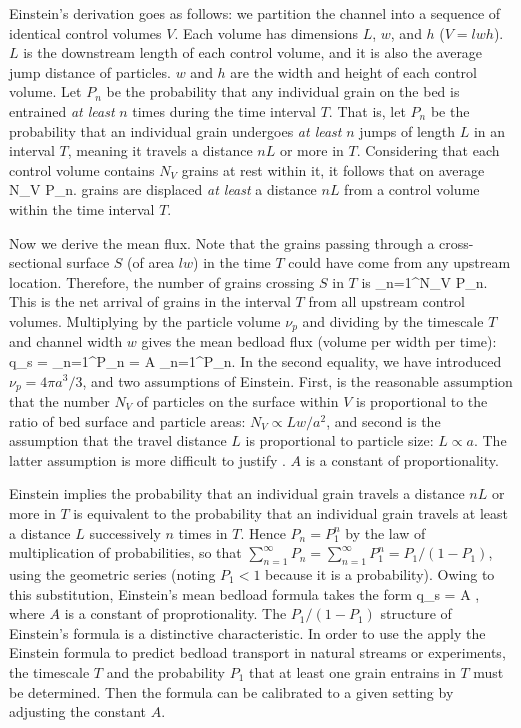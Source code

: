 Einstein's derivation goes as follows: we partition the channel into a sequence of identical control volumes $V$. 
Each volume has dimensions $L$, $w$, and $h$ ($V=lwh$). 
$L$ is the downstream length of each control volume, and it is also the average jump distance of particles. 
$w$ and $h$ are the width and height of each control volume.
Let $P_n$ be the probability that any individual grain on the bed is entrained \textit{at least} $n$ times during the time interval $T$. 
That is, let $P_n$ be the probability that an individual grain undergoes \textit{at least} $n$ jumps of length $L$ in an interval $T$, meaning it travels a distance $nL$ or more in $T$. 
Considering that each control volume contains $N_V$ grains at rest within it, it follows that on average
\be N_V P_n. \ee
grains are displaced \textit{at least} a distance $nL$ from a control volume within the time interval $T$.

Now we derive the mean flux. 
Note that the grains passing through a cross-sectional surface $S$ (of area $lw$) in the time $T$ could have come from any upstream location. 
Therefore, the number of grains crossing $S$ in $T$ is 
\be \sum_{n=1}^\infty N_V P_n. \ee
This is the net arrival of grains in the interval $T$ from all upstream control volumes. 
Multiplying by the particle volume $\nu_p$ and dividing by the timescale $T$ and channel width $w$ gives the mean bedload flux (volume per width per time):
\be \bra q_s \ket = \sum_{n=1}^\infty P_n = A  \sum_{n=1}^\infty P_n. \label{eq:einstein1}\ee 
In the second equality, we have introduced $\nu_p = 4\pi a^3/3$, and two assumptions of Einstein. First, is the reasonable assumption that the number $N_V$ of particles on the surface within $V$ is proportional to the ratio of bed surface and particle areas: $N_V \propto Lw/a^2$, and second is the assumption that the travel distance $L$ is proportional to particle size: $L \propto a$. The latter assumption is more difficult to justify \citep[e.g.][]{Yalin1972}. 
$A$ is a constant of proportionality. 

Einstein implies the probability that an individual grain travels a distance $nL$ or more in $T$ is equivalent to the probability that an individual grain travels at least a distance $L$ successively $n$ times in $T$. 
Hence $P_n = P_1^n$ by the law of multiplication of probabilities, so that $\sum_{n=1}^\infty P_n = \sum_{n=1}^\infty P_1^n = P_1/(1-P_1)$, using the geometric series (noting $P_1 < 1$ because it is a probability). 
Owing to this substitution, Einstein's mean bedload formula takes the form 
\be  \bra q_s \ket = A , \label{eq:einstein2} \ee
where $A$ is a constant of proprotionality.  
The $P_1/(1-P_1)$ structure of Einstein's formula is a distinctive characteristic. 
In order to use the apply the Einstein formula to predict bedload transport in natural streams or experiments, the timescale $T$ and the probability $P_1$ that at least one grain entrains in $T$ must be determined. 
Then the formula can be calibrated to a given setting by adjusting the constant $A$.  

